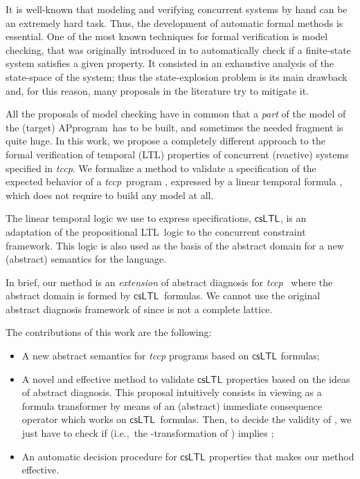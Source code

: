 \documentclass[american]{new_tlp}
\makeatletter
\providecommand{\ifempty}[3]{\def\@@@temp{#1}\ifx\@@@temp\@empty#2\else#3\fi}
\newcommand*{\csltl}[1][]{\ensuremath{\textsf{csLTL}_{#1}}}
\newcommand*{\ltl}{\textsf{LTL}}
\newcommand*{\query}[1][A]{\ifempty{#1}{P}{p}rogram}
\newcommand*{\tccp}{\textit{tccp}}
\providecommand*{\ie}   {i.e.,}
\makeatother
\begin{document}
It is well-known that modeling and verifying concurrent systems by hand can
be an extremely hard task.  Thus, the development of automatic formal
methods is essential.  One of the most known techniques for formal
verification is model checking, that was originally introduced in
\cite{ClarkeE81,QueilleS82} to automatically check if a finite-state system
satisfies a given property.  It consisted in an exhaustive analysis of the
state-space of the system; thus the state-explosion problem is its main
drawback and, for this reason, many proposals in the literature try to
mitigate it.






All the proposals of model checking have in common that a \emph{part} of
the model of the (target) \query\ has to be built, and sometimes the needed
fragment is quite huge.  In this work, we propose a completely different
approach to the formal verification of temporal (\ltl) properties of
concurrent (reactive) systems specified in \tccp.  We formalize a method to
validate a specification of the expected behavior of a \tccp\ program ,
expressed by a linear temporal formula , which does not require to
build any model at all.

The linear temporal logic we use to express specifications, \csltl, is an
adaptation of the propositional \ltl\ logic to the concurrent constraint
framework.
This logic is also used as the basis of the abstract domain for a new
(abstract) semantics for the language.

In brief, our method is an \emph{extension} of abstract diagnosis for
\tccp\ \cite{CominiTV11absdiag} where the abstract domain  is formed
by \csltl\ formulas.  We cannot use the original abstract diagnosis
framework of \cite{CominiTV11absdiag} since  is not a complete
lattice.



The contributions of this work are the following:
\begin{itemize}
    
    \item 
    A new abstract semantics for \tccp{} programs based on \csltl{}
    formulas;
    
    \item 
    A novel and effective method to validate \csltl{} properties based on
    the ideas of abstract diagnosis.  This proposal intuitively consists in
    viewing  as a formula transformer by means of an (abstract)
    immediate consequence operator  which works on \csltl\
    formulas.  Then, to decide the validity of , we just have to
    check if  (\ie\ the -transformation of )
    implies ;
    
    \item 
    An automatic decision procedure for \csltl{} properties that makes our
    method effective.
\end{itemize}
\end{document}
